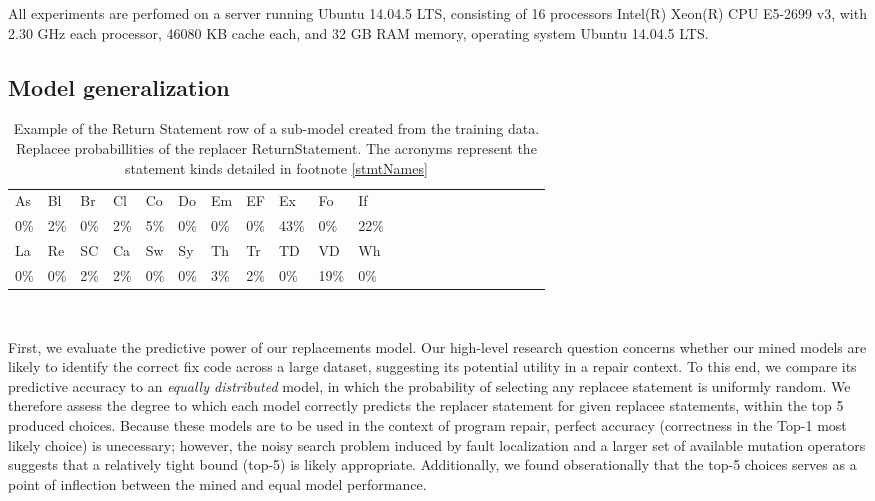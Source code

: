 \documentclass[conference]{IEEEtran}
\begin{document}

All experiments are perfomed on a server running Ubuntu 14.04.5 LTS, 
consisting of 16 processors Intel(R) Xeon(R) CPU E5-2699 v3, with 2.30 GHz each
processor, 46080 KB cache each, and 32 GB RAM memory, operating system Ubuntu 
14.04.5 LTS.

\subsection{Model generalization}
\label{sec:generalize}
  

\begin{table}[ht]
\begin{tabular}{llllllllllllllllllllll}
\hline
As & Bl & Br & Cl & Co & Do & Em & EF & Ex & Fo & If \\
0\%&2\%&0\%&2\%&5\%&0\%&0\%&0\%&43\%&0\%&22\% \\
\hline 
La & Re & SC & Ca & Sw & Sy & Th & Tr & TD & VD & Wh \\
0\%&0\%&2\%&2\%&0\%&0\%&3\%&2\%&0\%&19\%&0\% \\
\hline
\end{tabular}
\\
\caption{Example of the Return Statement row of a sub-model created from 
the training data. Replacee probabillities of the replacer ReturnStatement. The acronyms represent the statement kinds detailed in footnote \ref{stmtNames}}
 \label{fig:exPredReturn} 
\end{table} 

First, we evaluate the predictive power of our 
replacements model. Our high-level research question concerns whether 
our mined models are likely to identify the correct fix code across a large
dataset, suggesting its potential utility in a repair context.  To this end, we
compare its predictive accuracy to an \emph{equally distributed} model, in which
the probability of selecting any replacee statement is uniformly random. 
We therefore assess the degree to which each model correctly predicts the
replacer statement for given replacee statements, within the top 5 produced
choices.  Because these models are to be used in the context of program repair,
perfect accuracy (correctness in the Top-1 most likely choice) is unecessary;
however, the noisy search problem induced by fault localization and a larger set
of available mutation operators suggests that a relatively tight bound (top-5)
is likely appropriate.  Additionally, we found obserationally that the top-5
choices serves as a point of inflection between the mined and equal model
performance. 
\end{document}
